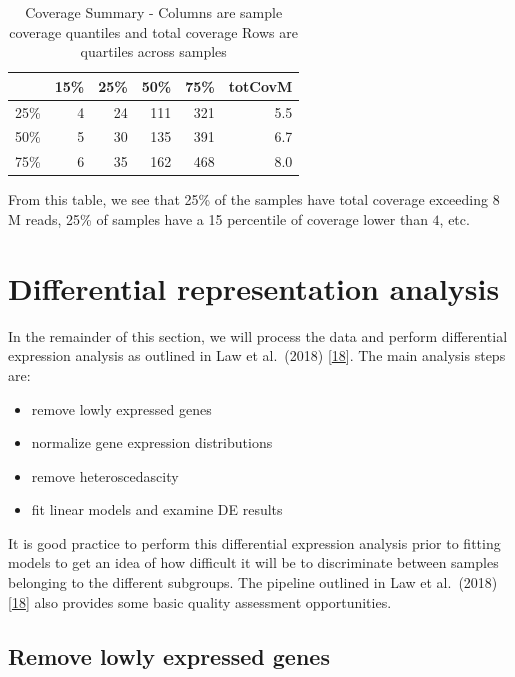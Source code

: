 \documentclass[
]{book}
\providecommand{\tightlist}{%
  \setlength{\itemsep}{0pt}\setlength{\parskip}{0pt}}
\begin{document}
\begin{table}

\caption{\label{tab:quantCountsA}Coverage Summary - Columns are sample coverage quantiles and total coverage 
Rows are quartiles across samples}
\centering
\begin{tabular}[t]{l|r|r|r|r|r}
\hline
  & 15\% & 25\% & 50\% & 75\% & totCovM\\
\hline
25\% & 4 & 24 & 111 & 321 & 5.5\\
\hline
50\% & 5 & 30 & 135 & 391 & 6.7\\
\hline
75\% & 6 & 35 & 162 & 468 & 8.0\\
\hline
\end{tabular}
\end{table}

From this table, we see that 25\% of the samples have total coverage exceeding
\(8\)M reads, 25\% of samples
have a 15 percentile of coverage lower than
\(4\), etc.

\hypertarget{dra}{%
\section{Differential representation analysis}\label{dra}}

In the remainder of this section, we will process the data and
perform differential expression analysis as outlined in
Law et al.~(2018) {[}\protect\hyperlink{ref-Law:2018aa}{18}{]}. The main analysis steps are:

\begin{itemize}
\tightlist
\item
  remove lowly expressed genes
\item
  normalize gene expression distributions
\item
  remove heteroscedascity
\item
  fit linear models and examine DE results
\end{itemize}

It is good practice to perform this differential expression analysis prior to
fitting models to get an idea of how difficult it will be to discriminate
between samples belonging to the different subgroups. The pipeline
outlined in Law et al.~(2018) {[}\protect\hyperlink{ref-Law:2018aa}{18}{]} also provides some
basic quality assessment opportunities.

\hypertarget{remove-lowly-expressed-genes}{%
\subsection*{Remove lowly expressed genes}\label{remove-lowly-expressed-genes}}
\end{document}
